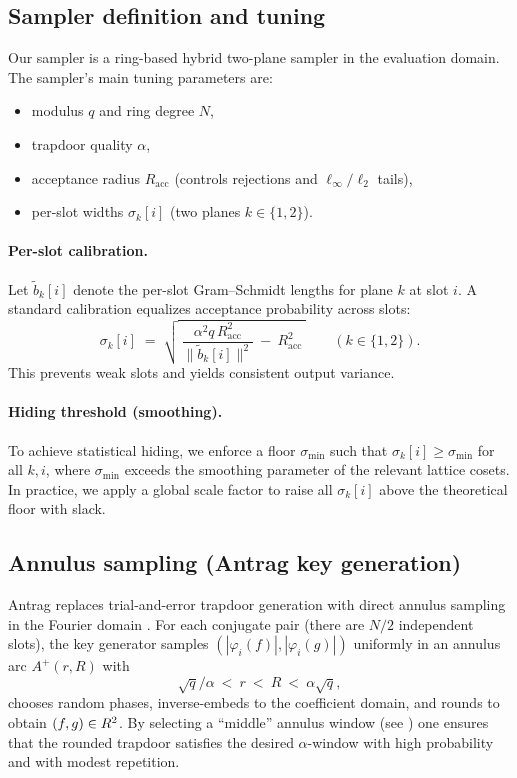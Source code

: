 \subsection{Sampler definition and tuning}
\label{subsec:sampler-tuning}
Our sampler is a ring-based hybrid two-plane sampler in the evaluation domain. The sampler’s main tuning parameters are:
\begin{itemize}[leftmargin=1.25em]
  \item modulus \(q\) and ring degree \(N\),
  \item trapdoor quality \(\alpha\),
  \item acceptance radius \(R_{\mathrm{acc}}\) (controls rejections and \(\ell_\infty/\ell_2\) tails),
  \item per-slot widths \(\sigma_k[i]\) (two planes \(k\in\{1,2\}\)).
\end{itemize}

\paragraph{Per-slot calibration.}
Let \(\widetilde{b}_k[i]\) denote the per-slot Gram--Schmidt lengths for plane \(k\) at slot \(i\). A standard
calibration equalizes acceptance probability across slots:
\[
  \sigma_k[i]
  \;=\;
  \sqrt{\ \frac{\alpha^2 q\,R_{\mathrm{acc}}^2}{\|\widetilde{b}_k[i]\|^2}\ -\ R_{\mathrm{acc}}^2\ }
  \qquad(k\in\{1,2\}).
\]
This prevents weak slots and yields consistent output variance.

\paragraph{Hiding threshold (smoothing).}
To achieve statistical hiding, we enforce a floor \(\sigma_{\min}\) such that \(\sigma_k[i]\ge \sigma_{\min}\) for all
\(k,i\), where \(\sigma_{\min}\) exceeds the smoothing parameter of the relevant lattice cosets. In practice, we apply a
global scale factor to raise all \(\sigma_k[i]\) above the theoretical floor with slack.

\subsection{Annulus sampling (Antrag key generation)}
\label{subsec:antrag}
Antrag replaces trial-and-error trapdoor generation with direct annulus sampling in the Fourier domain
\cite{EPRINT:ENSTW23}. For each conjugate pair (there are \(N/2\) independent slots), the key generator samples
\((|\varphi_i(f)|,|\varphi_i(g)|)\) uniformly in an annulus arc \(A^+(r,R)\) with
\[
  \sqrt{q}/\alpha \ <\ r \ <\ R \ <\ \alpha\sqrt{q},
\]
chooses random phases, inverse-embeds to the coefficient domain, and rounds to obtain \((f,g)\in R^2\). By selecting a
``middle'' annulus window (see \cite{EPRINT:ENSTW23}) one ensures that the rounded trapdoor satisfies the desired
\(\alpha\)-window with high probability and with modest repetition.

